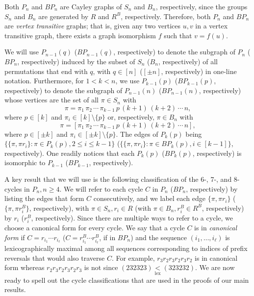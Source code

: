 \documentclass[final]{dmtcs-episciences}
\numberwithin{equation}{section}
\begin{document}
Both $P_n$ and $BP_n$ are Cayley graphs of $S_n$ and $B_n$, respectively, since the groups $S_n$ and $B_n$ are generated by $R$ and $R^B$, respectively. Therefore, both $P_n$ and $BP_n$ are \textit{vertex transitive} graphs; that is, given any two vertices $u,v$ in a vertex transitive graph, there exists a graph isomorphism $f$ such that $v=f(u)$. 


We will use $P_{n-1}(q)$ ($BP_{n-1}(q)$, respectively) to denote the subgraph of $P_n$ ($BP_n$, respectively) induced by the subset of $S_n$ ($B_n$, respectively) of all permutations that end with $q$, with $q\in[n]$ ($[\pm n]$, respectively) in one-line notation. Furthermore, for $1 < k < n$, we use $P_{k-1}(p)$ ($BP_{k-1}(p)$, respectively) to denote the subgraph of $P_{n-1}(n)$ ($BP_{n-1}(n)$, respectively) whose vertices are the set of all $\pi \in S_{n}$ with \begin{displaymath}\pi = \pi_1\, \pi_2\, \cdots \,\pi_{k-1}\, p \,(k+1)\, (k+2)\, \cdots\, n,\end{displaymath} where $p\in[k]$ and $\pi_i \in [k] \setminus \{p\}$ or, respectively, $\pi \in B_{n}$ with \begin{displaymath}\pi = [\pi_1\, \pi_2\, \cdots \,\pi_{k-1}\, p\, (k+1)\, (k+2)\, \cdots \,n],\end{displaymath} where $p \in [\pm k]$ and $\pi_i \in [\pm k] \setminus \{p\}$. The edges of $P_{k}(p)$ being $\{\{\pi,\pi r_i\}: \pi \in P_{k}(p), 2\leq i \leq k-1\}$ ($\{\{\pi,\pi r_i\}: \pi \in BP_{k}(p), i \in [k-1]\}$, respectively). One readily notices that each $P_k(p)$ ($BP_k(p)$, respectively) is isomorphic to $P_{k-1}$ ($BP_{k-1}$, respectively).

A key result that we will use is the following classification of the 6-, 7-, and 8-cycles in $P_n,n\geq4$. We will refer to each cycle $C$ in $P_n$ ($BP_n$, respectively) by listing the edges that form $C$ consecutively, and we label each edge $\{\pi,\pi r_i\}$ ($\{\pi,\pi r^B_i\}$, respectively), with $\pi\in S_n,r_i\in R$ (with $\pi\in B_n,r_i^B\in R^B$, respectively) by $r_i$ ($r_i^B$, respectively). Since there are multiple ways to refer to a cycle, we choose a canonical form for every cycle. We say that a cycle $C$ is in \emph{canonical form} if $C=r_{i_1}\cdots r_{i_{\ell}}$ ($C=r^B_{i_1}\cdots r^B_{i_{\ell}}$, if in $BP_n$) and the sequence $(i_1,\ldots,i_{\ell})$ is lexicographically maximal among all sequences corresponding to indices of prefix reversals that would also traverse $C$. For example, $r_3 r_2 r_3 r_2 r_3 r_2$ is in canonical form whereas $r_2 r_3 r_2 r_3 r_2 r_3$ is not since $(232323)\underset{\text{lex}}{<}(323232)$. We are now ready to spell out the cycle classifications that are used in the proofs of our main results.
\end{document}
